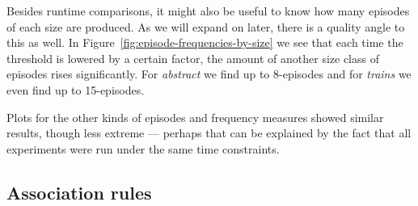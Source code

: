Besides runtime comparisons, it might also be useful to know how many episodes of each size are produced. As we will expand on later, there is a quality angle to this as well. In Figure~\ref{fig:episode-frequencies-by-size} we see that each time the threshold is lowered by a certain factor, the amount of another size class of episodes rises significantly. For \emph{abstract} we find up to 8-episodes and for \emph{trains} we even find up to 15-episodes.

Plots for the other kinds of episodes and frequency measures showed similar results, though less extreme --- perhaps that can be explained by the fact that all experiments were run under the same time constraints.


\subsection{Association rules}

